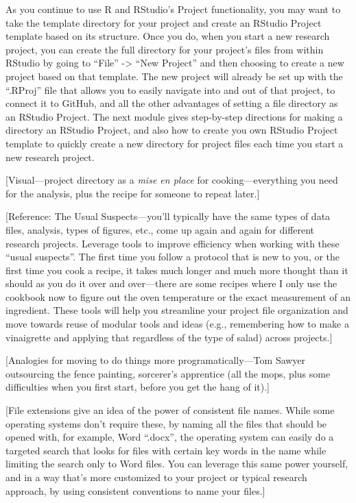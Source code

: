 \documentclass[]{tufte-book}
\begin{document}
As you continue to use R and RStudio's Project functionality, you may want to
take the template directory for your project and create an RStudio Project
template based on its structure. Once you do, when you start a new research
project, you can create the full directory for your project's files from within
RStudio by going to ``File'' -\textgreater{} ``New Project'' and then choosing to create a new
project based on that template. The new project will already be set up with the
``.RProj'' file that allows you to easily navigate into and out of that project,
to connect it to GitHub, and all the other advantages of setting a file
directory as an RStudio Project. The next module gives step-by-step directions
for making a directory an RStudio Project, and also how to create you own
RStudio Project template to quickly create a new directory for project files
each time you start a new research project.

{[}Visual---project directory as a \emph{mise en place} for cooking---everything you
need for the analysis, plus the recipe for someone to repeat later.{]}

{[}Reference: The Usual Suspects---you'll typically have the same types of data files,
analysis, types of figures, etc., come up again and again for different research
projects. Leverage tools to improve efficiency when working with these ``usual
suspects''. The first time you follow a protocol that is new to you, or the first
time you cook a recipe, it takes much longer and much more thought than it should
as you do it over and over---there are some recipes where I only use the cookbook
now to figure out the oven temperature or the exact measurement of an ingredient.
These tools will help you streamline your project file organization and move towards
reuse of modular tools and ideas (e.g., remembering how to make a vinaigrette and
applying that regardless of the type of salad) across projects.{]}

{[}Analogies for moving to do things more programatically---Tom Sawyer outsourcing the
fence painting, sorcerer's apprentice (all the mops, plus some difficulties when you
first start, before you get the hang of it).{]}

{[}File extensions give an idea of the power of consistent file names. While some
operating systems don't require these, by naming all the files that should be
opened with, for example, Word ``.docx'', the operating system can easily do a
targeted search that looks for files with certain key words in the name while
limiting the search only to Word files. You can leverage this same power yourself,
and in a way that's more customized to your project or typical research approach,
by using consistent conventions to name your files.{]}
\end{document}
